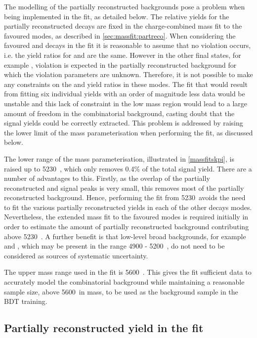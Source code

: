 The modelling of the partially reconstructed backgrounds pose a problem when being implemented in the \CP fit, as detailed below. The relative yields for the partially reconstructed decays are fixed in the charge-combined mass fit to the favoured modes, as described in \sect\ref{sec:massfit:partreco}. When considering the favoured \kpi and \kpipipi decays in the \CP fit it is reasonable to assume that no \CP violation occurs, i.e. the yield ratios for \Bm and \Bp are the same. However in the other \Dz final states, for example \pik, \CP violation is expected in the partially reconstructed background for which the \CP violation parameters are unknown. Therefore, it is not possible to make any constraints on the \Bp and \Bm yield ratios in these modes. The fit that would result from fitting six individual yields with an order of magnitude less data would be unstable and this lack of constraint in the low mass region would lead to a large amount of freedom in the combinatorial background, casting doubt that the signal yields could be correctly extracted. This problem is addressed by raising the lower limit of the \Bm mass parameterisation when performing the \CP fit, as discussed below.

The lower range of the mass parameterisation, illustrated in \fig\ref{massfitskpi}, is raised up to 5230~\mevcc, which only removes 0.4\% of the total signal yield. There are a number of advantages to this. Firstly, as the overlap of the partially reconstructed and signal peaks is very small, this removes most of the partially reconstructed background. Hence, performing the \CP fit from 5230~\mevcc avoids the need to fit the various partially reconstructed yields in each of the other \Dz decays modes. Nevertheless, the extended mass fit to the favoured modes is required initially in order to estimate the amount of partially reconstructed background contributing above 5230~\mevcc. A further benefit is that low-level broad backgrounds, for example \decay{\Bm}{\D\Kstarm\piz} and \decay{\Bd}{\Kp\pim\pip\pim}, which may be present in the range 4900 - 5200~\mevcc, do not need to be considered as sources of systematic uncertainty. 

The upper mass range used in the \CP fit is 5600~\mevcc. This gives the fit sufficient data to accurately model the combinatorial background while maintaining a reasonable sample size, above 5600~\mevcc in \Bm mass, to be used as the background sample in the BDT training.

\subsection{Partially reconstructed yield in the \CP fit}
\label{sec:cpfit:partrecoyields}

